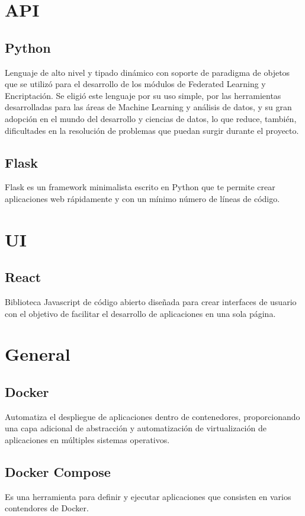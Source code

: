 \documentclass[
11pt, %
oneside, %
spanish, %
singlespacing, %
parskip, %
headsepline, %
chapterinoneline, %
]{MastersDoctoralThesis} %
\begin{document}
\section*{API}

\subsection*{Python \cite{py}}
Lenguaje de alto nivel y tipado dinámico con soporte de paradigma de objetos que se utilizó para el desarrollo de los módulos de Federated Learning y Encriptación. Se eligió este lenguaje por su uso simple, por las herramientas desarrolladas para las áreas de Machine Learning y análisis de datos, y su gran adopción en el mundo del desarrollo y ciencias de datos, lo que reduce, también, dificultades en la resolución de problemas que puedan surgir durante el proyecto.

\subsection*{Flask \cite{flask}}
Flask es un framework minimalista escrito en Python que te permite crear aplicaciones web rápidamente y con un mínimo número de líneas de código.

\section*{UI}

\subsection*{React \cite{rt}}
Biblioteca Javascript de código abierto diseñada para crear interfaces de usuario con el objetivo de facilitar el desarrollo de aplicaciones en una sola página.

\section*{General}

\subsection*{Docker \cite{docker}}
Automatiza el despliegue de aplicaciones dentro de contenedores, proporcionando una capa adicional de abstracción y automatización de virtualización de aplicaciones en múltiples sistemas operativos.

\subsection*{Docker Compose \cite{docker-compose}}
Es una herramienta para definir y ejecutar aplicaciones que consisten en varios contendores de Docker.
\end{document}
